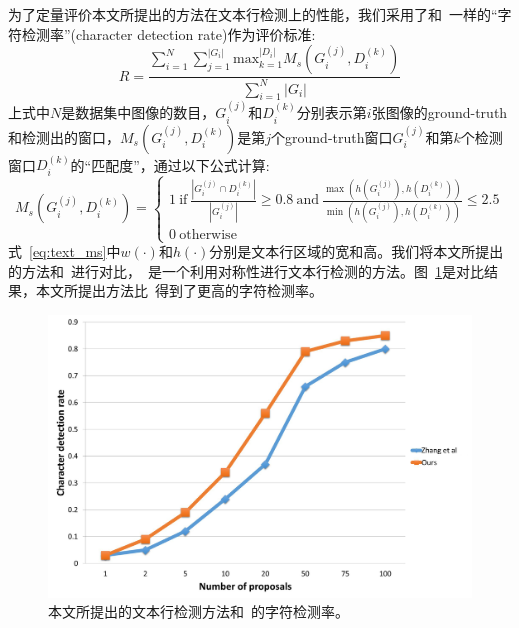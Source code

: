 \documentclass[UTF8]{ctexart}
\numberwithin{equation}{section} %
\numberwithin{table}{section} %
\begin{document}
为了定量评价本文所提出的方法在文本行检测上的性能，我们采用了和~\cite{Zhang15}一样的“字符检测率”(character detection rate)作为评价标准:
\begin{equation}
R = \frac{\sum_{i=1}^N\sum_{j=1}^{|G_i|}\text{max}_{k=1}^{|D_i|}M_s(G^{(j)}_i, D^{(k)}_i)}{\sum_{i=1}^N|G_i|}
\end{equation}
上式中$N$是数据集中图像的数目，$G^{(j)}_i$和$D^{(k)}_i$分别表示第$i$张图像的ground-truth和检测出的窗口，$M_s(G^{(j)}_i, D^{(k)}_i)$是第$j$个ground-truth窗口$G^{(j)}_i$和第$k$个检测窗口$D^{(k)}_i$的“匹配度”，通过以下公式计算:
\begin{equation}
M_s(G^{(j)}_i, D^{(k)}_i) = 
\begin{cases}
1 \ \text{if} \ \frac{|G^{(j)}_i \cap D^{(k)}_i|}{|G^{(j)}_i|} \geq 0.8 \ \text{and}\ \frac{\max(h(G^{(j)}_i),h(D^{(k)}_i))}{\min(h(G^{(j)}_i),h(D^{(k)}_i))} \leq 2.5 \\
0 \ \text{otherwise}
\end{cases}
\label{eq:text_ms}
\end{equation}
式~\ref{eq:text_ms}中$w(\cdot)$和$h(\cdot)$分别是文本行区域的宽和高。我们将本文所提出的方法和~\cite{Zhang15}进行对比，~\cite{Zhang15}是一个利用对称性进行文本行检测的方法。图~\ref{fig:character_detection_rate}是对比结果，本文所提出方法比~\cite{Zhang15}得到了更高的字符检测率。
\begin{figure}[H]
\centering
\includegraphics[scale=0.3]{figures/character_detection_rate}
\caption{本文所提出的文本行检测方法和~\cite{Zhang15}的字符检测率。}
\label{fig:character_detection_rate}
\end{figure}
\end{document}

